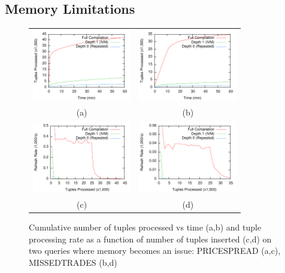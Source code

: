 \subsection{Memory Limitations}
\begin{figure}
\begin{center}
\hspace*{-0.2in}
\begin{tabular}{cc}
\includegraphics[width=1.7in]{../graphs/graphs/time_pricespread.pdf} &
\includegraphics[width=1.7in]{../graphs/graphs/time_missedtrades.pdf} \\
(a) & (b) \\
\includegraphics[width=1.7in]{../graphs/graphs/windowedrate_pricespread.pdf} &
\includegraphics[width=1.7in]{../graphs/graphs/windowedrate_missedtrades.pdf} \\
(c) & (d) \\
\end{tabular}
\caption{Cumulative number of tuples processed vs time (a,b) and tuple processing rate as a function of number of tuples inserted (c,d) on two queries where memory becomes an issue: PRICESPREAD (a,c), MISSEDTRADES (b,d)}
\label{fig:experiments:memissues}
\end{center}
\end{figure}



